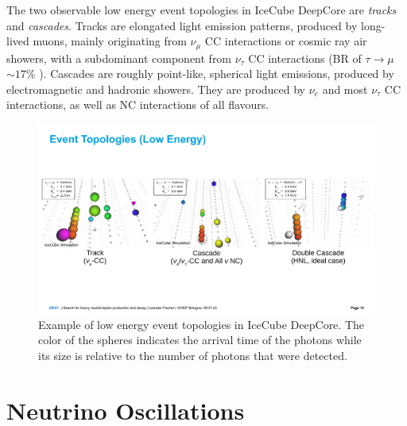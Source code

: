 \documentclass[a4paper,11pt]{article}
\begin{document}
The two observable low energy event topologies in IceCube DeepCore are \textit{tracks} and \textit{cascades}. Tracks are elongated light emission patterns, produced by long-lived muons, mainly originating from $\nu_{\mu}$ CC interactions or cosmic ray air showers, with a subdominant component from $\nu_{\tau}$ CC interactions (BR of $\tau\rightarrow\mu$ $\sim 17\%$ \cite{PhysRevD.98.030001}). Cascades are roughly point-like, spherical light emissions, produced by electromagnetic and hadronic showers. They are produced by $\nu_{e}$ and most $\nu_{\tau}$ CC interactions, as well as NC interactions of all flavours.



\begin{figure}[h]
    \includegraphics[trim = 0cm 4.5cm 0cm 5.5cm, clip, width=1.0\linewidth]{figures/event_views_all_three.png}
    \caption{Example of low energy event topologies in IceCube DeepCore. The color of the spheres indicates the arrival time of the photons while its size is relative to the number of photons that were detected.}
    \label{fig:low_energy_eventviews}
  \end{figure}


\section{Neutrino Oscillations} \label{sec:neutrino_oscillations}
\end{document}
